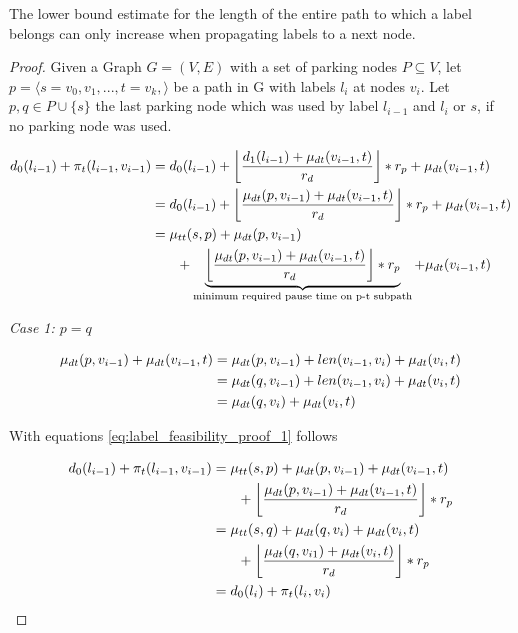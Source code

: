 The lower bound estimate for the length of the entire path to which a label belongs can only increase when propagating labels to a next node.

\begin{proof}
	Given a Graph $G=(V,E)$ with a set of parking nodes $P \subseteq V$, let $p = \langle s=v_0,v_1,...,t=v_k, \rangle$ be a path in G with labels $l_i$ at nodes $v_i$. Let $p,q \in P \cup \{s\}$ the last parking node which was used by label $l_{i-1}$ and $l_{i}$ or $s$, if no parking node was used.

	\begin{align}
		\begin{split}\label{eq:label_feasibility_proof_1}
			d_0(l_{i-1}) + \pi_t(l_{i-1},v_{i-1}) &= d_0(l_{i-1})+\floor*{ \frac{d_1(l_{i-1}) + \drivingtime(v_{i-1},t)}{\restr_d} } * \restr_p + \drivingtime(v_{i-1},t)\\
			&= d_0(l_{i-1})+ \floor*{ \frac{\drivingtime(p,v_{i-1}) + \drivingtime(v_{i-1},t)}{\restr_d} } * \restr_p + \drivingtime(v_{i-1},t)\\
			&=\traveltime(s,p) + \drivingtime(p,v_{i-1})\\
			& \phantom{{}=1} + \underbrace{\floor*{ \frac{\drivingtime(p,v_{i-1}) + \drivingtime(v_{i-1},t)}{\restr_d} } * \restr_p}_\text{minimum required pause time on p-t subpath} + \drivingtime(v_{i-1},t)
		\end{split}
	\end{align}

	\emph{Case 1: $p=q$}

	\begin{align}
		\begin{split}\label{eq:label_feasibility_proof_2}
			\mu_{dt}(p,v_{i-1}) + \mu_{dt}(v_{i-1},t) & = \mu_{dt}(p,v_{i-1}) + len(v_{i-1},v_i) + \mu_{dt}(v_i,t) \\
			& = \mu_{dt}(q,v_{i-1}) + len(v_{i-1},v_i) + \mu_{dt}(v_i,t) \\
			& = \mu_{dt}(q,v_i) + \mu_{dt}(v_i,t)
		\end{split}
	\end{align}

	With equations \ref{eq:label_feasibility_proof_1} follows

	\begin{align}
		\begin{split}\label{eq:label_feasibility_proof_3}
			d_0(l_{i-1}) + \pi_t(l_{i-1},v_{i-1}) &= \traveltime(s,p) + \drivingtime(p,v_{i-1}) + \drivingtime(v_{i-1},t)\\
			& \phantom{{}=1} + \floor*{ \frac{\drivingtime(p,v_{i-1}) + \drivingtime(v_{i-1},t)}{\restr_d} } * \restr_p\\
			&= \traveltime(s,q) + \drivingtime(q,v_{i}) + \drivingtime(v_{i},t)\\
			& \phantom{{}=1} + \floor*{ \frac{\drivingtime(q,v_{i1}) + \drivingtime(v_{i},t)}{\restr_d} } * \restr_p\\
			&= d_0(l_{i}) + \pi_t(l_{i},v_{i})
		\end{split}
	\end{align}


\end{proof}
